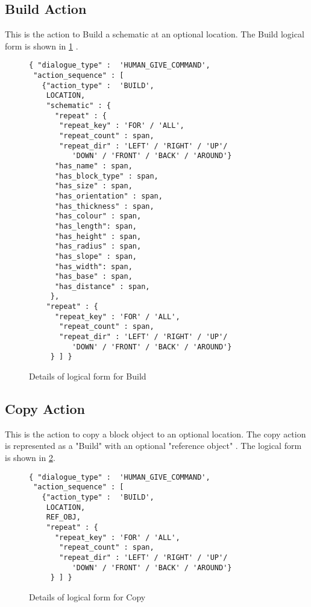 \subsection{ Build Action}
This is the action to Build a schematic at an optional location. The Build logical form is shown in \ref{fig:build_dict} .


\begin{figure}[ht]
    \centering
    \fontsize{8pt}{8pt}\selectfont
    \begin{verbatim}
{ "dialogue_type" :  'HUMAN_GIVE_COMMAND',
 "action_sequence" : [
   {"action_type" :  'BUILD',
    LOCATION,
    "schematic" : {
      "repeat" : {
       "repeat_key" : 'FOR' / 'ALL',
       "repeat_count" : span,
       "repeat_dir" : 'LEFT' / 'RIGHT' / 'UP'/ 
          'DOWN' / 'FRONT' / 'BACK' / 'AROUND'}
      "has_name" : span,
      "has_block_type" : span,
      "has_size" : span,
      "has_orientation" : span,
      "has_thickness" : span,
      "has_colour" : span,
      "has_length": span,
      "has_height" : span,
      "has_radius" : span,
      "has_slope" : span,
      "has_width": span,
      "has_base" : span,
      "has_distance" : span,
     },
    "repeat" : {
      "repeat_key" : 'FOR' / 'ALL',
       "repeat_count" : span,
       "repeat_dir" : 'LEFT' / 'RIGHT' / 'UP'/ 
          'DOWN' / 'FRONT' / 'BACK' / 'AROUND'}
     } ] }
    \end{verbatim}
    \vspace{-20pt}
    \caption{Details of logical form for Build}
    \vspace{-8pt}
    \label{fig:build_dict}
\end{figure}


\subsection{Copy Action}
This is the action to copy a block object to an optional location. The copy action is represented as a "Build" with an optional "reference object" . The logical form  is shown in \ref{fig:copy_dict}.


\begin{figure}[ht]
    \centering
    \fontsize{8pt}{8pt}\selectfont
    \begin{verbatim}
{ "dialogue_type" :  'HUMAN_GIVE_COMMAND',
 "action_sequence" : [
   {"action_type" :  'BUILD',
    LOCATION,
    REF_OBJ,
    "repeat" : {
      "repeat_key" : 'FOR' / 'ALL',
       "repeat_count" : span,
       "repeat_dir" : 'LEFT' / 'RIGHT' / 'UP'/ 
          'DOWN' / 'FRONT' / 'BACK' / 'AROUND'}
     } ] }
    \end{verbatim}
    \vspace{-20pt}
    \caption{Details of logical form for Copy}
    \vspace{-8pt}
    \label{fig:copy_dict}
\end{figure}

